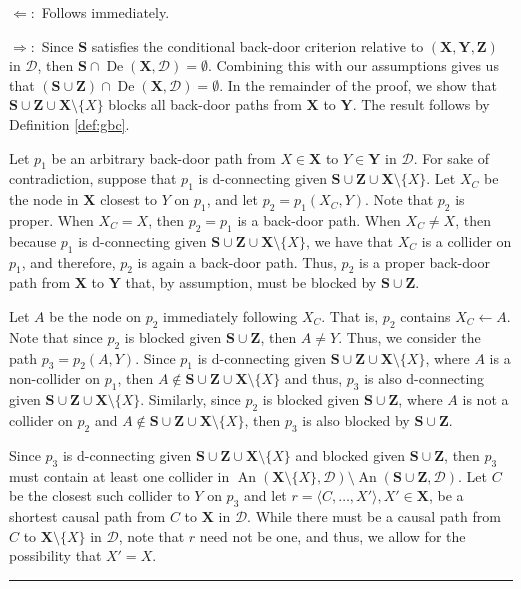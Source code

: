 \documentclass[twoside]{article}
\DeclareMathOperator{\An}{An}
\DeclareMathOperator{\De}{De}
\newcommand{\mb}[1]{\mathbf{#1}}
\newcommand{\g}[1][G]{\mathcal{#1}}
\newenvironment{proofof}[1][]{\begin{trivlist}
\item[\hskip \labelsep {\bfseries Proof of #1.}]}{\hfill\BlackBox\end{trivlist}}
\newcommand{\BlackBox}{\rule{1.5ex}{1.5ex}}
\begin{document}
\begin{proofof}[Lemma \ref{lem:gbc-cbc}] 
    $\Leftarrow:$ Follows immediately.
    
    $\Rightarrow:$ Since $\mb{S}$ satisfies the conditional back-door criterion relative to $(\mb{X}, \mb{Y}, \mb{Z})$ in $\g[D]$, then $\mb{S} \cap \De(\mb{X}, \g[D]) = \emptyset$. Combining this with our assumptions gives us that $(\mb{S} \cup \mb{Z}) \cap \De(\mb{X}, \g[D]) = \emptyset$. In the remainder of the proof, we show that $\mb{S} \cup \mb{Z} \cup \mb{X} \setminus \{X\}$ blocks all back-door paths from $\mb{X}$ to $\mb{Y}$. The result follows by Definition \ref{def:gbc}.

    Let $p_1$ be an arbitrary back-door path from $X \in \mb{X}$ to $Y \in \mb{Y}$ in $\g[D]$. For sake of contradiction, suppose that $p_1$ is d-connecting given $\mb{S} \cup \mb{Z} \cup \mb{X} \setminus \{X\}$. Let $X_C$ be the node in $\mb{X}$ closest to $Y$ on $p_1$, and let $p_2=p_1(X_C,Y)$. Note that $p_2$ is proper. When $X_C=X$, then $p_2=p_1$ is a back-door path. When $X_C \neq X$, then because $p_1$ is d-connecting given $\mb{S} \cup \mb{Z} \cup \mb{X} \setminus \{X\}$, we have that $X_C$ is a collider on $p_1$, and therefore, $p_2$ is again a back-door path. Thus, $p_2$ is a proper back-door path from $\mb{X}$ to $\mb{Y}$ that, by assumption, must be blocked by $\mb{S} \cup \mb{Z}$. 

    Let $A$ be the node on $p_2$ immediately following $X_C$. That is, $p_2$ contains $X_C \gets A$. Note that since $p_2$ is blocked given $\mb{S} \cup \mb{Z}$, then $A \neq Y$. Thus, we consider the path $p_3 = p_2(A,Y)$. Since $p_1$ is d-connecting given $\mb{S} \cup \mb{Z} \cup \mb{X} \setminus \{X\}$, where $A$ is a non-collider on $p_1$, then $A \notin \mb{S} \cup \mb{Z} \cup \mb{X} \setminus \{X\}$ and thus, $p_3$ is also d-connecting given $\mb{S} \cup \mb{Z} \cup \mb{X} \setminus \{X\}$. Similarly, since $p_2$ is blocked given $\mb{S} \cup \mb{Z}$, where $A$ is not a collider on $p_2$ and $A \notin \mb{S} \cup \mb{Z} \cup \mb{X} \setminus \{X\}$, then $p_3$ is also blocked by $\mb{S} \cup \mb{Z}$. 

    Since $p_3$ is d-connecting given $\mb{S} \cup \mb{Z} \cup \mb{X} \setminus \{X\}$ and blocked given $\mb{S} \cup \mb{Z}$, then $p_3$ must contain at least one collider in $\An(\mb{X} \setminus \{X\},\g[D]) \setminus \An(\mb{S} \cup \mb{Z},\g[D])$. Let $C$ be the closest such collider to $Y$ on $p_3$ and let $r=\langle C,\ldots,X' \rangle, X' \in \mb{X}$, be a shortest causal path from $C$ to $\mb{X}$ in $\g[D]$. While there must be a causal path from $C$ to $\mb{X} \setminus \{X\}$ in $\g[D]$, note that $r$ need not be one, and thus, we allow for the possibility that $X'=X$.


\end{proofof}
\end{document}
